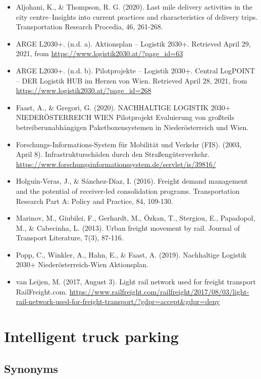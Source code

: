 \documentclass[
]{book}
\providecommand{\tightlist}{%
  \setlength{\itemsep}{0pt}\setlength{\parskip}{0pt}}
\begin{document}
\begin{itemize}
\tightlist
\item
  Aljohani, K., \& Thompson, R. G. (2020). Last mile delivery activities in the city centre--Insights into current practices and characteristics of delivery trips. Transportation Research Procedia, 46, 261-268.
\item
  ARGE L2030+. (n.d. a). Aktionsplan -- Logistik 2030+. Retrieved April 29, 2021, from \url{https://www.logistik2030.at/?page_id=63}
\item
  ARGE L2030+. (n.d. b). Pilotprojekte -- Logistik 2030+. Central LogPOINT -- DER Logistik HUB im Herzen von Wien. Retrieved April 28, 2021, from \url{https://www.logistik2030.at/?page_id=268}
\item
  Faast, A., \& Gregori, G. (2020). NACHHALTIGE LOGISTIK 2030+ NIEDERÖSTERREICH WIEN Pilotprojekt Evaluierung von großteils betreiberunabhängigen Paketboxensystemen in Niederösterreich und Wien.
\item
  Forschungs-Informations-System für Mobilität und Verkehr (FIS). (2003, April 8). Infrastrukturschäden durch den Straßengüterverkehr. \url{https://www.forschungsinformationssystem.de/servlet/is/39816/}
\item
  Holguín-Veras, J., \& Sánchez-Díaz, I. (2016). Freight demand management and the potential of receiver-led consolidation programs. Transportation Research Part A: Policy and Practice, 84, 109-130.
\item
  Marinov, M., Giubilei, F., Gerhardt, M., Özkan, T., Stergiou, E., Papadopol, M., \& Cabecinha, L. (2013). Urban freight movement by rail. Journal of Transport Literature, 7(3), 87-116.
\item
  Popp, C., Winkler, A., Hahn, E., \& Faast, A. (2019). Nachhaltige Logistik 2030+ Niederösterreich-Wien Aktionsplan.
\item
  van Leijen, M. (2017, August 3). Light rail network used for freight transport \textbar{} RailFreight.com. \url{https://www.railfreight.com/railfreight/2017/08/03/light-rail-network-used-for-freight-transport/?gdpr=accept\&gdpr=deny}
\end{itemize}

\hypertarget{intelligent_truck_park}{%
\section{Intelligent truck parking}\label{intelligent_truck_park}}

\hypertarget{synonyms-28}{%
\subsection*{Synonyms}\label{synonyms-28}}
\end{document}
